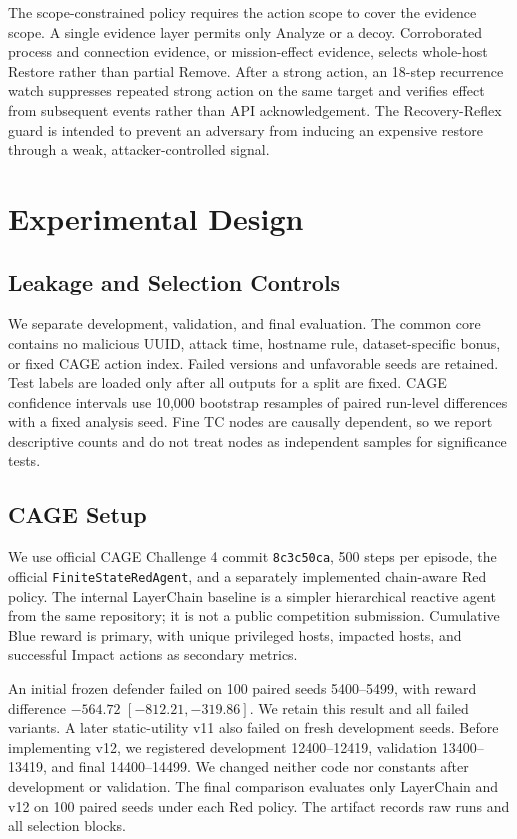 \documentclass[runningheads]{llncs}
\begin{document}
The scope-constrained policy requires the action scope to cover the evidence scope. A single evidence layer permits only Analyze or a decoy. Corroborated process and connection evidence, or mission-effect evidence, selects whole-host Restore rather than partial Remove. After a strong action, an 18-step recurrence watch suppresses repeated strong action on the same target and verifies effect from subsequent events rather than API acknowledgement. The Recovery-Reflex guard is intended to prevent an adversary from inducing an expensive restore through a weak, attacker-controlled signal.

\section{Experimental Design}

\subsection{Leakage and Selection Controls}

We separate development, validation, and final evaluation. The common core contains no malicious UUID, attack time, hostname rule, dataset-specific bonus, or fixed CAGE action index. Failed versions and unfavorable seeds are retained. Test labels are loaded only after all outputs for a split are fixed. CAGE confidence intervals use 10,000 bootstrap resamples of paired run-level differences with a fixed analysis seed. Fine TC nodes are causally dependent, so we report descriptive counts and do not treat nodes as independent samples for significance tests.

\subsection{CAGE Setup}

We use official CAGE Challenge 4 commit \texttt{8c3c50ca}, 500 steps per episode, the official \texttt{FiniteStateRedAgent}, and a separately implemented chain-aware Red policy. The internal LayerChain baseline is a simpler hierarchical reactive agent from the same repository; it is not a public competition submission. Cumulative Blue reward is primary, with unique privileged hosts, impacted hosts, and successful Impact actions as secondary metrics.

An initial frozen defender failed on 100 paired seeds 5400--5499, with reward difference $-564.72$ $[-812.21,-319.86]$. We retain this result and all failed variants. A later static-utility v11 also failed on fresh development seeds. Before implementing v12, we registered development 12400--12419, validation 13400--13419, and final 14400--14499. We changed neither code nor constants after development or validation. The final comparison evaluates only LayerChain and v12 on 100 paired seeds under each Red policy. The artifact records raw runs and all selection blocks.
\end{document}
